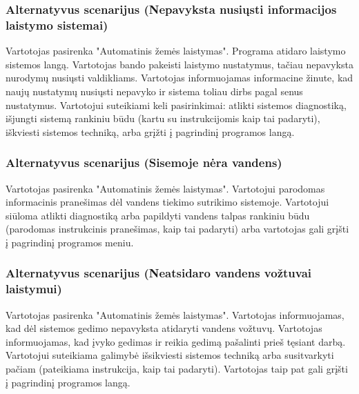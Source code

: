 \documentclass[oneside]{VUMIFPSkursinis}
\begin{document}
	\subsubsection{Alternatyvus scenarijus (Nepavyksta nusiųsti informacijos laistymo sistemai)}
	Vartotojas pasirenka "Automatinis žemės laistymas". Programa atidaro laistymo sistemos langą. Vartotojas bando pakeisti laistymo nustatymus, tačiau nepavyksta nurodymų nusiųsti valdikliams. Vartotojas informuojamas informacine žinute, kad naujų nustatymų nusiųsti nepavyko ir sistema toliau dirbs pagal senus nustatymus. Vartotojui suteikiami keli pasirinkimai: atlikti sistemos diagnostiką, išjungti sistemą rankiniu būdu (kartu su instrukcijomis kaip tai padaryti), iškviesti sistemos techniką, arba grįžti į pagrindinį programos langą.
	\subsubsection{Alternatyvus scenarijus (Sisemoje nėra vandens)}
	Vartotojas pasirenka "Automatinis žemės laistymas". Vartotojui parodomas informacinis pranešimas dėl vandens tiekimo sutrikimo sistemoje. Vartotojui siūloma atlikti diagnostiką arba papildyti vandens talpas rankiniu būdu (parodomas instrukcinis pranešimas, kaip tai padaryti) arba vartotojas gali grįšti į pagrindinį programos meniu.
	\subsubsection{Alternatyvus scenarijus (Neatsidaro vandens vožtuvai laistymui)}
	Vartotojas pasirenka "Automatinis žemės laistymas". Vartotojas informuojamas, kad dėl sistemos gedimo nepavyksta atidaryti vandens vožtuvų. Vartotojas informuojamas, kad įvyko gedimas ir reikia gedimą pašalinti prieš tęsiant darbą. Vartotojui suteikiama galimybė išsikviesti sistemos techniką arba susitvarkyti pačiam (pateikiama instrukcija, kaip tai padaryti).  Vartotojas taip pat gali grįšti į pagrindinį programos langą.
\end{document}
